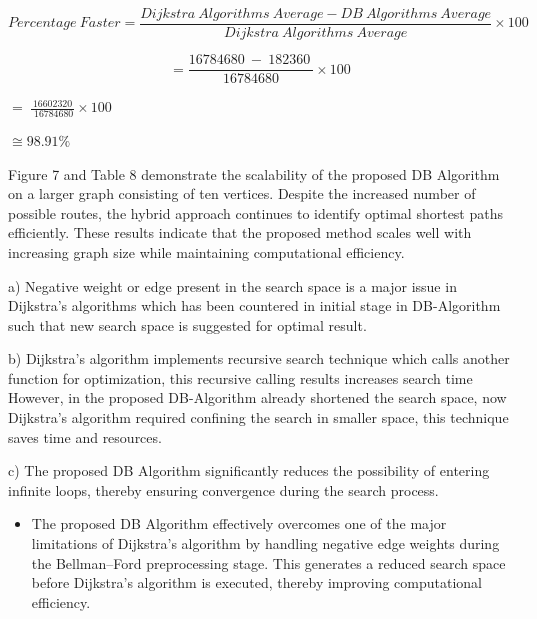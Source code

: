 \documentclass[10pt]{NSP1}
\begin{document}
\par\medskip{}\smallskip

\[
Percentage\ Faster = \frac{Dijkstra\ Algorithms\ Average - DB\ Algorithms\ Average}{Dijkstra\ Algorithms\ Average} \times 100
\]

\[
= \frac{16784680\ - \ 182360\ }{16784680} \times 100
\]

\(= \ \frac{\ 16602320\ }{\ 16784680} \times 100\)

\(\cong 98.91\%\)

Figure 7 and Table 8 demonstrate the scalability of the proposed DB Algorithm on a larger graph consisting of ten vertices. Despite the increased number of possible routes, the hybrid approach continues to identify optimal shortest paths efficiently. These results indicate that the proposed method scales well with increasing graph size while maintaining computational efficiency.

\par\medskip{}\smallskip

a) Negative weight or edge present in the search space is a major issue in Dijkstra's algorithms which has been countered in initial stage in DB-Algorithm such that new search space is suggested for optimal result.

b) Dijkstra's algorithm implements recursive search technique which calls another function for optimization, this recursive calling results increases search time However, in the proposed DB-Algorithm already shortened the search space, now Dijkstra's algorithm required confining the search in smaller space, this technique saves time and resources.

c) The proposed DB Algorithm significantly reduces the possibility of entering infinite loops, thereby ensuring convergence during the search process.

\par\medskip{}\smallskip

\begin{itemize}
  \item The proposed DB Algorithm effectively overcomes one of the major limitations of Dijkstra's algorithm by handling negative edge weights during the Bellman–Ford preprocessing stage. This generates a reduced search space before Dijkstra's algorithm is executed, thereby improving computational efficiency.
\end{itemize}
\end{document}
